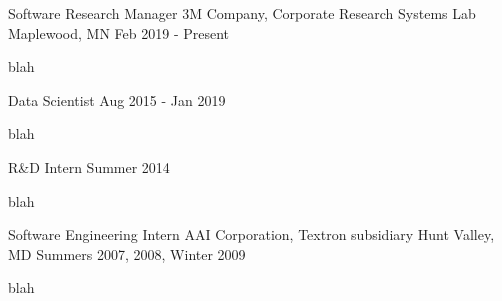 

\begin{cventries}

  \cventry
    {Software Research Manager} %
    {3M Company, Corporate Research Systems Lab} %
    {Maplewood, MN} %
    {Feb 2019 - Present} %
    {
      \begin{cvitems} %
       \item {blah}
      \end{cvitems}
    }

  \cventry
    {Data Scientist} %
    {} %
    {} %
    {Aug 2015 - Jan 2019} %
    {
      \begin{cvitems} %
        \item {blah}
      \end{cvitems}
    }

  \cventry
    {R\&D Intern} %
    {} %
    {} %
    {Summer 2014} %
    {
      \begin{cvitems} %
        \item {blah}
      \end{cvitems}
    }

  \cventry
    {Software Engineering Intern} %
    {AAI Corporation, Textron subsidiary} %
    {Hunt Valley, MD} %
    {Summers 2007, 2008, Winter 2009} %
    {
      \begin{cvitems} %
        \item {blah}
      \end{cvitems}
    }

\end{cventries}
